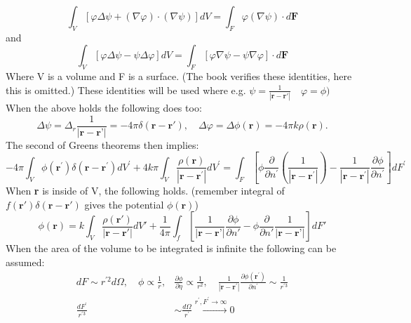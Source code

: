 \begin{equation}
    \int_{V}[\varphi \Delta \psi+(\nabla \varphi) \cdot(\nabla \psi)] d V=\int_{F} \varphi(\nabla \psi) \cdot d \mathbf{F}
\end{equation}
and
\begin{equation}
    \int_{V}[\varphi \Delta \psi-\psi \Delta \varphi] d V=\int_{F}[\varphi \nabla \psi-\psi \nabla \varphi] \cdot d \mathbf{F}
\end{equation}
Where V is a volume and F is a surface. (The book verifies these identities, here this is omitted.) These identities will be used where
e.g. $ \displaystyle \psi = \frac{1}{|\textbf{r}-\textbf{r}'|} \quad \varphi = \phi)$ 
\\
\noindent When the above holds the following does too:
\begin{equation}
    \Delta \psi = \Delta_r \frac{1}{|\textbf{r}-\textbf{r'}|} = -4\pi \delta(\textbf{r}-\textbf{r}'), \quad \Delta \varphi = \Delta \phi(\textbf{r}) = -4\pi k \rho(\textbf{r}).
\end{equation}
The second of Greens theorems then implies:
\begin{equation}
    -4 \pi \int_{V} \phi\left(\mathbf{r}^{\prime}\right) \delta\left(\mathbf{r}-\mathbf{r}^{\prime}\right) d V^{\prime}+4 k \pi \int_{V} \frac{\rho(\mathbf{r})}{\left|\mathbf{r}-\mathbf{r}^{\prime}\right|} d V^{\prime} =\int_{F}\left[\phi \frac{\partial}{\partial n^{\prime}}\left(\frac{1}{\left|\mathbf{r}-\mathbf{r}^{\prime}\right|}\right)-\frac{1}{\left|\mathbf{r}-\mathbf{r}^{\prime}\right|} \frac{\partial \phi}{\partial n^{\prime}}\right] d F^{\prime} 
\end{equation}
When \textbf{r} is inside of V, the following holds. (remember integral of $f(\textbf{r}')\delta(\textbf{r}- \textbf{r}')$ gives the potential $\phi(\textbf{r})$)
\begin{equation}
    \phi(\textbf{r}) = k \int_V \frac{\rho(\textbf{r}')}{|\textbf{r}-\textbf{r}'|} dV' + \frac{1}{4\pi}\int_f \left[\frac{1}{|\textbf{r}-\textbf{r'}|}\frac{\partial \phi}{\partial n'}-\phi\frac{\partial}{\partial n'}\frac{1}{|\textbf{r}-\textbf{r'}|} \right] dF'
\end{equation}
When the area of the volume to be integrated is infinite the following can be assumed:
\begin{equation}
    \begin{aligned}
    d F \sim r^{\prime 2} d \Omega, \quad \phi \propto \frac{1}{r}, & \frac{\partial \phi}{\partial \eta} \propto \frac{1}{r^{2}}, \quad \frac{1}{\left|\mathbf{r}-\mathbf{r}^{\prime}\right|} \frac{\partial \phi\left(\mathbf{r}^{\prime}\right)}{\partial n^{\prime}} \sim \frac{1}{r^{\prime 3}} \\
    \frac{d F^{\prime}}{r^{\prime 3}} & \sim \frac{d \Omega}{{r^{\prime}}} \stackrel{r^{\prime}, F^{\prime} \rightarrow \infty}{\longrightarrow} 0
    \end{aligned}
\end{equation}
